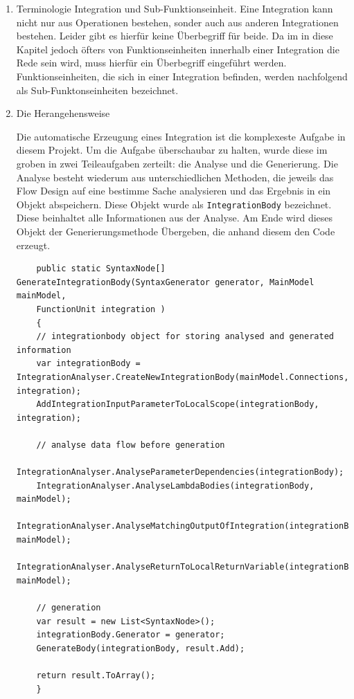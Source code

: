 \begin{enumerate}
	\item Terminologie
	\label{sec:orgheadline44}
	Integration und Sub-Funktionseinheit. Eine Integration kann nicht nur aus
	Operationen bestehen, sonder auch aus anderen Integrationen bestehen.
	Leider gibt es hierfür keine Überbegriff für beide.
	Da im in diese Kapitel jedoch öfters von Funktionseinheiten innerhalb einer
	Integration die Rede sein wird, muss hierfür ein Überbegriff eingeführt
	werden. Funktionseinheiten, die sich in einer Integration befinden, werden
	nachfolgend als Sub-Funktonseinheiten bezeichnet.
	
	\item Die Herangehensweise
	\label{sec:orgheadline45}
	
	Die automatische Erzeugung eines Integration ist die komplexeste Aufgabe in
	diesem Projekt. Um die Aufgabe überschaubar zu halten, wurde diese im groben in
	zwei Teileaufgaben zerteilt: die Analyse und die Generierung.
	Die Analyse besteht wiederum aus unterschiedlichen Methoden, die jeweils das
	Flow Design auf eine bestimme Sache analysieren und das Ergebnis in ein Objekt
	abspeichern. Diese Objekt wurde als \texttt{IntegrationBody} bezeichnet.
	Diese beinhaltet alle Informationen aus der Analyse. Am Ende wird dieses Objekt
	der Generierungsmethode Übergeben, die anhand diesem den Code erzeugt.
	
	\begin{verbatim}
	public static SyntaxNode[] GenerateIntegrationBody(SyntaxGenerator generator, MainModel mainModel,
	FunctionUnit integration )
	{
	// integrationbody object for storing analysed and generated information
	var integrationBody = IntegrationAnalyser.CreateNewIntegrationBody(mainModel.Connections, integration);
	AddIntegrationInputParameterToLocalScope(integrationBody, integration);
	
	// analyse data flow before generation 
	IntegrationAnalyser.AnalyseParameterDependencies(integrationBody);
	IntegrationAnalyser.AnalyseLambdaBodies(integrationBody, mainModel);
	IntegrationAnalyser.AnalyseMatchingOutputOfIntegration(integrationBody, mainModel);
	IntegrationAnalyser.AnalyseReturnToLocalReturnVariable(integrationBody, mainModel);
	
	// generation
	var result = new List<SyntaxNode>();
	integrationBody.Generator = generator;
	GenerateBody(integrationBody, result.Add);
	
	return result.ToArray();
	}
	\end{verbatim}
	

\end{enumerate}
